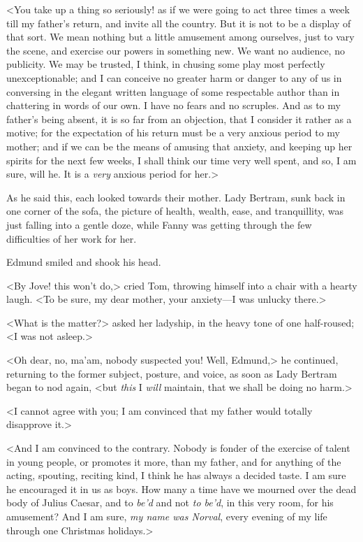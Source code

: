 <You take up a thing so seriously! as if we were going to act three times a week till my father's return, and invite all the country. But it is not to be a display of that sort. We mean nothing but a little amusement among ourselves, just to vary the scene, and exercise our powers in something new. We want no audience, no publicity. We may be trusted, I think, in chusing some play most perfectly unexceptionable; and I can conceive no greater harm or danger to any of us in conversing in the elegant written language of some respectable author than in chattering in words of our own. I have no fears and no scruples. And as to my father's being absent, it is so far from an objection, that I consider it rather as a motive; for the expectation of his return must be a very anxious period to my mother; and if we can be the means of amusing that anxiety, and keeping up her spirits for the next few weeks, I shall think our time very well spent, and so, I am sure, will he. It is a \textit{very}  anxious period for her.>

As he said this, each looked towards their mother. Lady Bertram, sunk back in one corner of the sofa, the picture of health, wealth, ease, and tranquillity, was just falling into a gentle doze, while Fanny was getting through the few difficulties of her work for her.

Edmund smiled and shook his head.

<By Jove! this won't do,> cried Tom, throwing himself into a chair with a hearty laugh. <To be sure, my dear mother, your anxiety—I was unlucky there.>

<What is the matter?> asked her ladyship, in the heavy tone of one half-roused; <I was not asleep.>

<Oh dear, no, ma'am, nobody suspected you! Well, Edmund,> he continued, returning to the former subject, posture, and voice, as soon as Lady Bertram began to nod again, <but \textit{this}  I \textit{will}  maintain, that we shall be doing no harm.>

<I cannot agree with you; I am convinced that my father would totally disapprove it.>

<And I am convinced to the contrary. Nobody is fonder of the exercise of talent in young people, or promotes it more, than my father, and for anything of the acting, spouting, reciting kind, I think he has always a decided taste. I am sure he encouraged it in us as boys. How many a time have we mourned over the dead body of Julius Caesar, and to \textit{be'd}  and not \textit{to be'd}, in this very room, for his amusement? And I am sure, \textit{my name was Norval}, every evening of my life through one Christmas holidays.>

